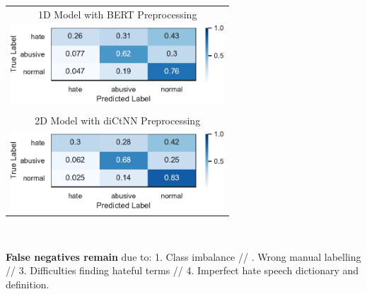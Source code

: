 \documentclass[a0paper,landscape]{baposter}
\begin{document}
\begin{poster}
{   %
\begin{center}
    \begin{tabular}{c}
    1D Model with BERT Preprocessing \\
    \includegraphics[width=8cm,keepaspectratio]{figures/confusion_matrix_testing_CNN_experiment_1D_FINAL.pdf} \\
    \\
    2D Model with diCtNN Preprocessing \\
    \includegraphics[width=8cm,keepaspectratio]{figures/confusion_matrix_testing_CNN_experiment_2D_FINAL.pdf}
    \end{tabular}
\\
    \begin{compactitem}
    \item \textbf{False negatives remain} due to: 
    1. Class imbalance // . Wrong manual labelling // 3. Difficulties finding hateful terms // 4. Imperfect hate speech dictionary and definition.
    \end{compactitem}
\end{center}
}



\end{poster}
\end{document}
